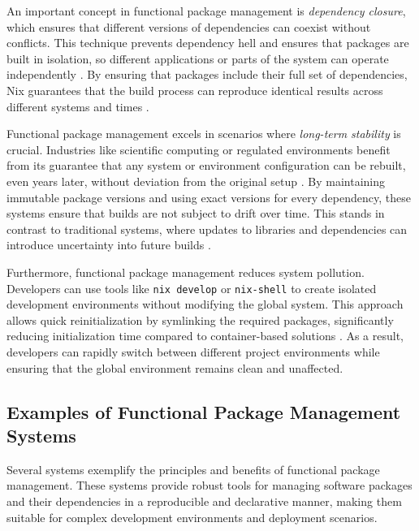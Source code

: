An important concept in functional package management is \textit{dependency closure},
which ensures that different versions of dependencies can coexist without conflicts.
This technique prevents dependency hell and ensures that packages are built in isolation,
so different applications or parts of the system can operate independently
\cite[Chapter 3.3]{dolstraPurelyFunctionalSoftware2006}. By ensuring that packages
include their full set of dependencies, Nix guarantees that the build process can
reproduce identical results across different systems and times
\cite[Section 2.1]{courtesFunctionalPackageManagement2013}.

Functional package management excels in scenarios where \textit{long-term stability}
is crucial. Industries like scientific computing or regulated environments benefit
from its guarantee that any system or environment configuration can be rebuilt,
even years later, without deviation from the original setup
\cite[Section 2, Page 5]{rahmanWorksMeCannot2022}. By maintaining immutable
package versions and using exact versions for every dependency, these systems ensure
that builds are not subject to drift over time. This stands in contrast to traditional
systems, where updates to libraries and dependencies can introduce uncertainty into
future builds \cite[Chapter 5.2]{dolstraPurelyFunctionalSoftware2006}.

Furthermore, functional package management reduces system pollution. Developers can
use tools like \texttt{nix develop} or \texttt{nix-shell} to create isolated development
environments without modifying the global system. This approach allows quick
reinitialization by symlinking the required packages, significantly reducing
initialization time compared to container-based solutions
\cite{NixDevelopNix, NixshellNixReference}. As a result, developers can rapidly
switch between different project environments while ensuring that the global
environment remains clean and unaffected.

\subsection{Examples of Functional Package Management Systems}

Several systems exemplify the principles and benefits of functional package management.
These systems provide robust tools for managing software packages and their dependencies
in a reproducible and declarative manner, making them suitable for complex development
environments and deployment scenarios.


